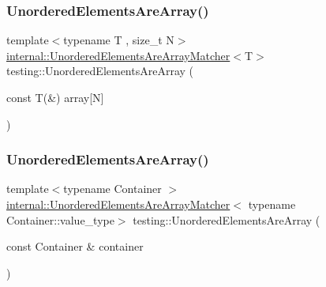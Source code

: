 \mbox{\label{namespacetesting_a23c7729cfc61967f3271018076c4b724}} 
\subsubsection{\texorpdfstring{Unordered\+Elements\+Are\+Array()}{UnorderedElementsAreArray()}\hspace{0.1cm}{\footnotesize\ttfamily [3/4]}}
{\footnotesize\ttfamily template$<$typename T , size\+\_\+t N$>$ \\
\hyperlink{classtesting_1_1internal_1_1_unordered_elements_are_array_matcher}{internal\+::\+Unordered\+Elements\+Are\+Array\+Matcher}$<$T$>$ testing\+::\+Unordered\+Elements\+Are\+Array (\begin{DoxyParamCaption}\item[{const T(\&)}]{array\mbox{[}\+N\mbox{]} }\end{DoxyParamCaption})\hspace{0.3cm}{\ttfamily [inline]}}

\mbox{\label{namespacetesting_a72b0ee2217293106fcf4971dc4a59f4c}} 
\subsubsection{\texorpdfstring{Unordered\+Elements\+Are\+Array()}{UnorderedElementsAreArray()}\hspace{0.1cm}{\footnotesize\ttfamily [4/4]}}
{\footnotesize\ttfamily template$<$typename Container $>$ \\
\hyperlink{classtesting_1_1internal_1_1_unordered_elements_are_array_matcher}{internal\+::\+Unordered\+Elements\+Are\+Array\+Matcher}$<$ typename Container\+::value\+\_\+type$>$ testing\+::\+Unordered\+Elements\+Are\+Array (\begin{DoxyParamCaption}\item[{const Container \&}]{container }\end{DoxyParamCaption})\hspace{0.3cm}{\ttfamily [inline]}}

\mbox{\label{namespacetesting_a3e800c56ae70a6d9955077a75d4971f1}} 
